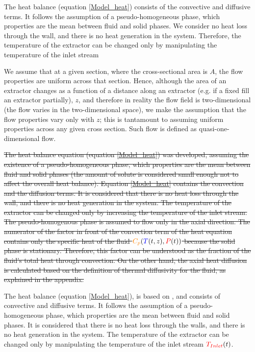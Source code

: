 \documentclass[../Article_Model_Parameters.tex]{subfiles}
\begin{document}
		 {\color{red}
			The heat balance (equation \ref{Model_heat}) consists of the convective and diffusive terms. It follows the assumption of a pseudo-homogeneous phase, which properties are the mean between fluid and solid phases. We consider no heat loss through the wall, and there is no heat generation in the system. Therefore, the temperature of the extractor can be changed only by manipulating the temperature of the inlet stream %
			
			We assume that at a given section, where the cross-sectional area is $A$, the flow properties are uniform across that section. Hence, although the area of an extractor changes  as a function of a distance along an extractor (e.g. if a fixed fill an extractor partially), $z$, and therefore in reality the flow field is two-dimensional (the flow varies in the two-dimensional space), we make the assumption that the flow properties vary only with $z$; this is tantamount to assuming uniform properties across any given cross section. Such flow is defined as quasi-one-dimensional flow.
			
		}
		
		\sout{The heat balance equation (equation  \ref{Model_heat}) was developed, assuming the existence of a pseudo-homogeneous phase, which properties are the mean between fluid and solid phases (the amount of solute is considered small enough not to affect the overall heat balance). Equation \ref{Model_heat} contains the convection and the diffusion terms. It is considered that there is no heat loss through the wall, and there is no heat generation in the system. The temperature of the extractor can be changed only by increasing the temperature of the inlet stream. The pseudo-homogenous phase is assumed to flow only in the axial direction. The numerator of the factor in front of the convection term of the heat equation contains only the specific heat of the fluid ${\color{orange}C_p}({\color{blue}T}(t,z),{\color{red}P}(t))$ because the solid phase is stationary. Therefore, this factor can be understood as the fraction of the fluid's total heat through convection. On the other hand, the axial heat diffusion is calculated based on the definition of thermal diffusivity for the fluid, as explained in the appendix. }
			
		{\color{blue} The heat balance (equation \ref{Model_heat}), is based on \citet{Srinivasan2012}, and consists of convective and diffusive terms. It follows the assumption of a pseudo-homogeneous phase, which properties are the mean between fluid and solid phases. It is considered that there is no heat loss through the walls, and there is no heat generation in the system. The temperature of the extractor can be changed only by manipulating the temperature of the inlet stream ${\color{red}T_{Inlet}}(t)$.
			}
			
\end{document}
